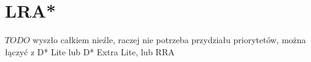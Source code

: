 \section{LRA*}
$TODO$ wyszło całkiem nieźle, raczej nie potrzeba przydziału priorytetów, można łączyć z D* Lite lub D* Extra Lite, lub RRA